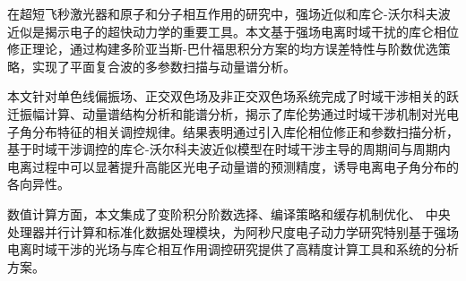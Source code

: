 \begin{chineseabstract}
在超短飞秒激光器和原子和分子相互作用的研究中，强场近似和库仑-沃尔科夫波近似是揭示电子的超快动力学的重要工具。本文基于强场电离时域干扰的库仑相位修正理论，通过构建多阶亚当斯-巴什福思积分方案的均方误差特性与阶数优选策略，实现了平面复合波的多参数扫描与动量谱分析。

本文针对单色线偏振场、正交双色场及非正交双色场系统完成了时域干涉相关的跃迁振幅计算、动量谱结构分析和能谱分析，揭示了库伦势通过时域干涉机制对光电子角分布特征的相关调控规律。结果表明通过引入库伦相位修正和参数扫描分析，基于时域干涉调控的库仑-沃尔科夫波近似模型在时域干涉主导的周期间与周期内电离过程中可以显著提升高能区光电子动量谱的预测精度，诱导电离电子角分布的各向异性。

数值计算方面，本文集成了变阶积分阶数选择、编译策略和缓存机制优化、
中央处理器并行计算和标准化数据处理模块，为阿秒尺度电子动力学研究特别基于强场电离时域干涉的光场与库仑相互作用调控研究提供了高精度计算工具和系统的分析方案。

\end{chineseabstract}

